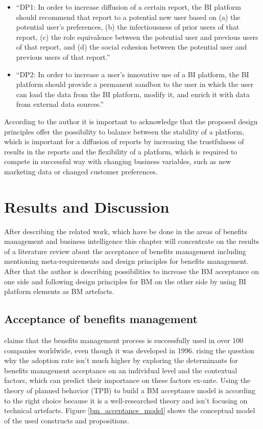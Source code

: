 \begin{itemize}
\item ``DP1: In order to increase diffusion of a certain report, the BI platform
should recommend that report to a potential new user based
on (a) the potential user’s preferences, (b) the infectiousness of
prior users of that report, (c) the role equivalence between the potential
user and previous users of that report, and (d) the social
cohesion between the potential user and previous users of that report.''\citep[p.683]{kretzer_designer_2015} 
\item ``DP2: In order to increase a user’s innovative use of a BI platform,
the BI platform should provide a permanent sandbox to the user in
which the user can load the data from the BI platform, modify it,
and enrich it with data from external data sources.''\citep[p.684]{kretzer_designer_2015} 
\end{itemize}

According to the author it is important to acknowledge that the proposed design principles offer the possibility to balance between the stability of a platform, which is important for a diffusion of reports by increasing the trustfulness of results in the reports and the flexibility of a platform, which is required to compete in successful way with changing business variables, such as new marketing data or changed customer preferences. 

\chapter{Results and Discussion}
\label{bm_for_bi}

After describing the related work, which have be done in the areas of benefits management and business intelligence this chapter will concentrate on the results of a literature review about the acceptance of benefits management including mentioning meta-requirements and design principles for benefits management. After that the author is describing possibilities to increase the BM acceptance on one side and following design principles for BM on the other side by using BI platform elements as BM artefacts. 

\section{Acceptance of benefits management}
\label{acceptance_benefits_management}

\citet[p.8]{ward_benefits_2012} claims that the benefits management process is successfully used in over 100 companies worldwide, even though it was developed in 1996. \citet{hesselmann_not_2015} rising the question why the adoption rate isn't much higher by exploring the determinants for benefits management acceptance on an individual level and the contextual factors, which can predict their importance on these factors ex-ante. Using the theory of planned behavior (TPB) to build a BM acceptance model is according to \citet[p.589]{hesselmann_not_2015} the right choice because it is a well-researched theory and isn't focusing on technical artefacts. Figure \ref{bm_acceptance_model} shows the conceptual model of the used constructs and propositions.

